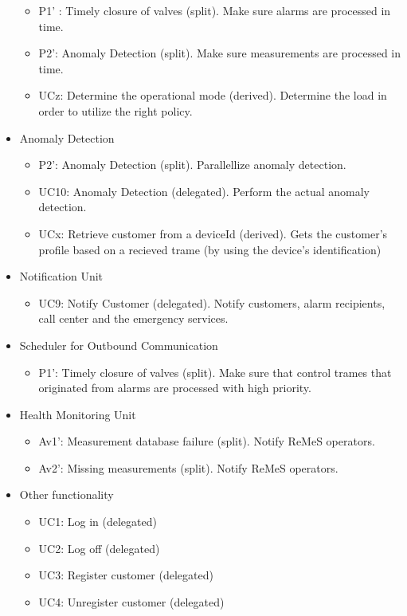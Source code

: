 \begin{itemize}
\begin{itemize}
		\item P1' : Timely closure of valves (split). Make sure alarms are processed
		in time. 
	  	\item P2': Anomaly Detection (split). Make sure measurements are processed
	  	in time. 
		\item UCz: Determine the operational mode (derived). Determine the load in
		order to utilize the right policy.
	\end{itemize}
	\item Anomaly Detection
	\begin{itemize}
		\item P2': Anomaly Detection (split). Parallellize anomaly detection.
		\item UC10: Anomaly Detection (delegated). Perform the actual anomaly
		detection.
	  	\item UCx: Retrieve customer from a deviceId (derived). Gets the customer's
	  	profile based on a recieved trame (by using the device's identification)
	\end{itemize}
	\item Notification Unit
	\begin{itemize}
		\item UC9: Notify Customer (delegated). Notify customers, alarm recipients,
		call center and the emergency services. 
	\end{itemize}
	\item Scheduler for Outbound Communication
	\begin{itemize}
	  \item P1': Timely closure of valves (split). Make sure that control trames
	  that originated from alarms are processed with high priority. 
	\end{itemize}
	\item Health Monitoring Unit
	\begin{itemize}
		\item Av1': Measurement database failure (split). Notify ReMeS operators. 
		\item Av2': Missing measurements (split). Notify ReMeS operators.
	\end{itemize}
	\item Other functionality
	\begin{itemize}
	  	\item UC1: Log in (delegated)
	  	\item UC2: Log off (delegated)
	  	\item UC3: Register customer (delegated)
	  	\item UC4: Unregister customer (delegated)

\end{itemize}
\end{itemize}
